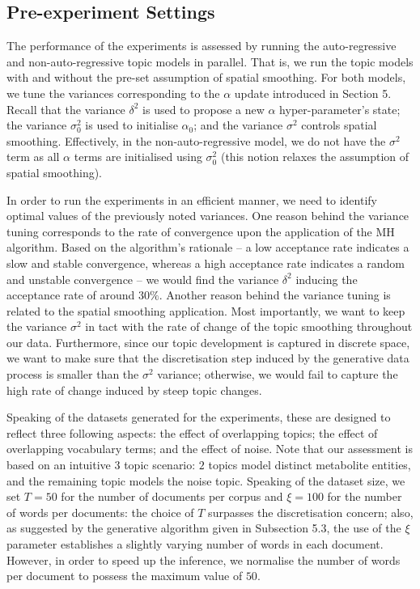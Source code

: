 \documentclass{mpaper}
\begin{document}
\subsection{Pre-experiment Settings}

\par The performance of the experiments is assessed by running the auto-regressive and non-auto-regressive topic models in parallel. That is, we run the topic models with and without the pre-set assumption of spatial smoothing. For both models, we tune the variances corresponding to the $\alpha$ update introduced in Section 5. Recall that the variance $\delta^2$ is used to propose a new $\alpha$ hyper-parameter's state; the variance $\sigma_0^2$ is used to initialise $\alpha_0$; and the variance $\sigma^2$ controls spatial smoothing. Effectively, in the non-auto-regressive model, we do not have the $\sigma^2$ term as all $\alpha$ terms are initialised using $\sigma_0^2$ (this notion relaxes the assumption of spatial smoothing).

\par In order to run the experiments in an efficient manner, we need to identify optimal values of the previously noted variances. One reason behind the variance tuning corresponds to the rate of convergence upon the application of the MH algorithm. Based on the algorithm's rationale -- a low acceptance rate indicates a slow and stable convergence, whereas a high acceptance rate indicates a random and unstable convergence -- we would find the variance $\delta^2$ inducing the acceptance rate of around $30\%$. Another reason behind the variance tuning is related to the spatial smoothing application. Most importantly, we want to keep the variance $\sigma^2$ in tact with the rate of change of the topic smoothing throughout our data. Furthermore, since our topic development is captured in discrete space, we want to make sure that the discretisation step induced by the generative data process is smaller than the $\sigma^2$ variance; otherwise, we would fail to capture the high rate of change induced by steep topic changes.
\par Speaking of the datasets generated for the experiments, these are designed to reflect three following aspects: the effect of overlapping topics; the effect of overlapping vocabulary terms; and the effect of noise. Note that our assessment is based on an intuitive $3$ topic scenario: $2$ topics model distinct metabolite entities, and the remaining topic models the noise topic. Speaking of the dataset size, we set $T=50$ for the number of documents per corpus and $\xi=100$ for the number of words per documents: the choice of $T$ surpasses the discretisation concern; also, as suggested by the generative algorithm given in Subsection 5.3, the use of the $\xi$ parameter establishes a slightly varying number of words in each document. However, in order to speed up the inference, we normalise the number of words per document to possess the maximum value of $50$.
\end{document}
